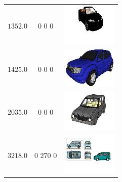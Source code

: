 \begin{longtable}{ccc}
	$1352.0$ & 0 0 0 & \includegraphics{models/ae5e896e943fe44fe4fa0d9a98009166.jpg}\\
	$1425.0$ & 0 0 0 & \includegraphics{models/6c3174f862a5a9a1590ee3f3aa63d479.jpg}\\
	$2035.0$ & 0 0 0 & \includegraphics{models/3381909e60dd6a5291af0bf49336b8c6.jpg}\\
	$3218.0$ & 0 270 0 & \includegraphics{models/8766de36a2aca3d46ab70fd3a5dd1e73.jpg}\\
\end{longtable}